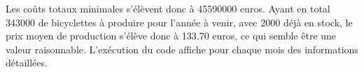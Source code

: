 \documentclass[11pt,a4paper]{report}
\begin{document}
Les coûts totaux minimales s'élèvent donc à 45590000 euros. Ayant en total 343000 de bicyclettes à produire pour l'année à venir, avec 2000 déjà en stock, le prix moyen de production s'élève donc à 133.70 euros, ce qui semble être une valeur raisonnable. L'exécution du code affiche pour chaque mois des informations détaillées.
\end{document}
